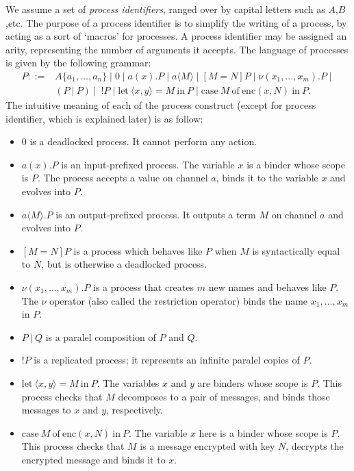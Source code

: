\documentclass{article}
\begin{document}
We assume a set of {\em process identifiers}, ranged over by capital letters such
as $A$,$B$,etc. The purpose of a process identifier is to simplify the writing of a process,
by acting as a sort of `macros' for processes. 
A process identifier may be assigned an arity, representing the number of arguments it accepts. 
The language of processes is given by the following grammar:
$$
\begin{array}{ll}
P ::= & A\{a_1,\ldots,a_n\} \mid 0 \mid a(x).P \mid a\langle M \rangle \mid [M = N] P \mid 
        \nu (x_1,\ldots,x_m). P \mid \\
  & (P ~|~ P) \mid ~ !P \mid 
 \mathrm{let}~ \langle x, y \rangle = M ~ \mathrm{ in } ~ P
 \mid
\mathrm{case} ~ M ~ \mathrm{ of } ~ \mathrm{enc}(x,N) ~ \mathrm{ in } ~ P.
\end{array}
$$
The intuitive meaning of each of the process construct (except for process identifier, which
is explained later) is as follow:
\begin{itemize}
\item $0$ is a deadlocked process. It cannot perform any action.
\item $a(x).P$ is an input-prefixed process. The variable $x$ is a binder whose scope is $P$.
The process accepts a value on channel $a$, binds it to the
variable $x$ and evolves into $P$. 
\item $a\langle M \rangle.P$ is an output-prefixed process. It outputs a term $M$ on channel $a$
and evolves into $P$.
\item $[M = N] P$ is a process which behaves like $P$ when $M$ is syntactically equal to $N$,
but is otherwise a deadlocked process. 
\item $\nu (x_1,\ldots,x_m). P$ is a process that creates $m$ new names and behaves like $P$. 
The $\nu$ operator (also called the restriction operator) binds the name $x_1,\ldots, x_m$ in $P$. 
\item $P ~|~ Q$ is a paralel composition of $P$ and $Q$.
\item $!P$ is a replicated process; it represents an infinite paralel copies of $P$. 
\item $\mathrm{let}~ \langle x, y \rangle = M ~ \mathrm{ in } ~ P.$ The variables $x$ and $y$
are binders whose scope is $P$. This process checks that $M$ decomposes to a pair of messages,
and binds those messages to $x$ and $y$, respectively. 
\item $\mathrm{case} ~ M ~ \mathrm{ of } ~ \mathrm{enc}(x,N) ~ \mathrm{ in } ~ P.$
The variable $x$ here is a binder whose scope is $P$. 
This process checks that $M$ is a message encrypted with key $N$, decrypts the
encrypted message and binds it to $x.$
\end{itemize}
\end{document}
